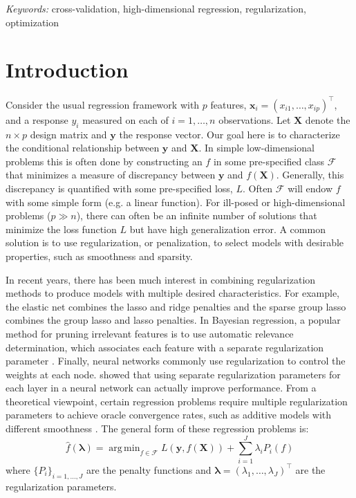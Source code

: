 \documentclass[12pt]{article}
\DeclareMathOperator*{\argmin}{arg\,min}
\begin{document}
\noindent%
{\it Keywords:}  cross-validation, high-dimensional regression, regularization, optimization
\vfill

\newpage
{}
\section{Introduction}
Consider the usual regression framework with $p$ features, $\boldsymbol x_i = (x_{i1},\ldots,x_{ip})^\top$, and a response $y_i$ measured on each of $i=1,\ldots,n$ observations. Let $\boldsymbol X$ denote the $n \times p$ design matrix and $\boldsymbol y$ the response vector. Our goal here is to characterize the conditional relationship between $\boldsymbol y$ and $\boldsymbol X$. In simple low-dimensional problems this is often done by constructing an $f$ in some pre-specified class $\mathcal{F}$ that minimizes a measure of discrepancy between $\boldsymbol y$ and $f(\boldsymbol X)$. Generally, this discrepancy is quantified with some pre-specified loss, $L$. Often $\mathcal{F}$ will endow $f$ with some simple form (e.g. a linear function). For ill-posed or high-dimensional problems ($p \gg n$), there can often be an infinite number of solutions that minimize the loss function $L$ but have high generalization error. A common solution is to use regularization, or penalization, to select models with desirable properties, such as smoothness and sparsity.

In recent years, there has been much interest in combining regularization methods to produce models with multiple desired characteristics. For example, the elastic net \citep{zou2003regression} combines the lasso and ridge penalties and the sparse group lasso \citep{simon2013sparse} combines the group lasso and lasso penalties. In Bayesian regression, a popular method for pruning irrelevant features is to use automatic relevance determination, which associates each feature with a separate regularization parameter \citep{neal1996bayesian}. Finally, neural networks commonly use regularization to control the weights at each node. \citet{snoek2012practical} showed that using separate regularization parameters for each layer in a neural network can actually improve performance. From a theoretical viewpoint, certain regression problems require multiple regularization parameters to achieve oracle convergence rates, such as additive models with different smoothness \citep{van2014additive}. The general form of these regression problems is:
\begin{equation} \label {eq:basic}
\hat f(\boldsymbol{\lambda}) = \argmin_{f\in\mathcal{F}} L\left (\boldsymbol{y}, f (\boldsymbol{X}) \right ) + \sum\limits_{i=1}^J \lambda_i P_i(f)
\end{equation}
where $\{P_i\}_{i=1, ..., J}$ are the penalty functions and $\boldsymbol{\lambda} = (\lambda_1, \ldots, \lambda_J)^\top$ are the regularization parameters. 
\end{document}
